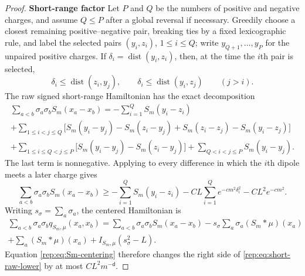 \documentclass[11pt,reqno]{amsart}
\numberwithin{equation}{section}
\theoremstyle{plain}
\theoremstyle{definition}
\renewcommand{\d}{\mathsf d}
\newcommand{\step}[1]{\par\medskip\noindent\textbf{#1}}
\begin{document}
\begin{proof}
\step{Short-range factor} Let $P$ and $Q$ be the numbers of positive and negative charges, and assume $Q\le P$ after a global reversal if necessary.  Greedily choose a closest remaining positive--negative pair, breaking ties by a fixed lexicographic rule, and label the selected pairs $(y_i,z_i)$, $1\le i\le Q$; write $y_{Q+1},\ldots,y_P$ for the unpaired positive charges.  If $\delta_i=\operatorname{dist}(y_i,z_i)$, then, at the time the $i$th pair is selected,
\begin{equation}\label{rep:eq:greedy-heat}
 \delta_i\le\operatorname{dist}(z_i,y_j),\qquad
 \delta_i\le\operatorname{dist}(y_i,z_j)
 \qquad(j>i).
\end{equation}
The raw signed short-range Hamiltonian has the exact decomposition
\begin{multline}\label{rep:eq:short-dipole-decomposition}
 \sum_{a<b}\sigma_a\sigma_bS_m(x_a-x_b)
 =-\sum_{i=1}^Q S_m(y_i-z_i)\\
 +\sum_{1\le i<j\le Q}
 \bigl[S_m(y_i-y_j)-S_m(z_i-y_j)
 +S_m(z_i-z_j)-S_m(y_i-z_j)\bigr]\\
 +\sum_{1\le i\le Q<j\le P}
 \bigl[S_m(y_i-y_j)-S_m(z_i-y_j)\bigr]
 +\sum_{Q<i<j\le P}S_m(y_i-y_j).
\end{multline}
The last term is nonnegative.  Applying  to every difference in which the $i$th dipole meets a later charge gives
\begin{equation}\label{rep:eq:short-raw-lower}
 \sum_{a<b}\sigma_a\sigma_bS_m(x_a-x_b)
 \ge-\sum_{i=1}^QS_m(y_i-z_i)
 -CL\sum_{i=1}^Qe^{-cm^2\delta_i^2}-CL^2e^{-cm^2}.
\end{equation}
Writing $s_\sigma=\sum_a\sigma_a$, the centered Hamiltonian is
\begin{multline}\label{rep:eq:centered-signed-short}
 \sum_{a<b}\sigma_a\sigma_bq_{S_m,\mu}(x_a,x_b)
 =\sum_{a<b}\sigma_a\sigma_bS_m(x_a-x_b)
 -s_\sigma\sum_a\sigma_a(S_m*\mu)(x_a)\\
 +\sum_a(S_m*\mu)(x_a)+I_{S_m,\mu}(s_\sigma^2-L).
\end{multline}
Equation \eqref{rep:eq:Sm-centering} therefore changes the right side of \eqref{rep:eq:short-raw-lower} by at most $CL^2m^{-\d}$.


\end{proof}
\end{document}
